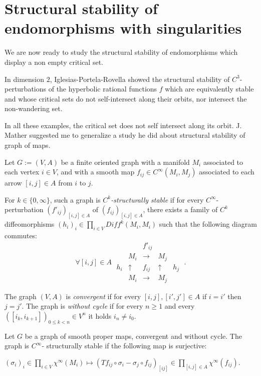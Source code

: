 \documentclass[11pt,openany,leqno]{article}
\begin{document}
\section{Structural stability of endomorphisms with singularities}
\label{Sec_SS_endo_w_Singu}
We are now ready to study the structural stability of endomorphisms which display a non empty critical set. 


In dimension $2$, Iglesias-Portela-Rovella \cite{IPR08} showed the structural stability of $C^3$-perturbations of the hyperbolic rational functions $f$ which are equivalently stable and whose critical sets do not self-intersect along their orbits, nor intersect the non-wandering set. 

In all these examples, the critical set does not self intersect along its orbit. J. Mather suggested me to generalize a study he did about structural stability of graph of maps.


Let $G:=(V,A)$ be a finite oriented graph with a manifold $M_i$ associated to each vertex $i\in V$, and with a smooth map $f_{ij}\in C^\infty(M_i,M_j)$ associated to each arrow $[i,j]\in A$ from $i$ to $j$.


For $k\in \{0,\infty\}$, such a graph is \emph{ $C^k$-structurally stable} if for every $C^\infty$-perturbation 
$(f'_{ij})_{[i,j]\in A}$ of $(f_{ij})_{[i,j]\in A}$, there exists a family of $C^k$ diffeomorphisms $(h_{i})_i\in \prod_{i\in V} Diff^k(M_i, M_i)$ such that the following diagram commutes:
\[\forall [i,j]\in A\; \begin{array}{rcccl}
& &f'_{ij} & &\\ 
&M_i & \rightarrow&M_j &\\
h_i&\uparrow& f_{ij}&\uparrow&h_j\\
&M_i & \rightarrow&M_j & \end{array}\; .\]

The graph $(V, A)$ is \emph{convergent} if for every $[i,j], [i',j']\in A$ if $i=i'$ then $j=j'$. The graph is \emph{without cycle} if for every $n\ge 1$ and every  $([i_k,i_{k+1}])_{0\le k< n}\in V^n$ it holds $i_n\not= i_0$. 


\begin{thm}[Mather]
Let $G$ be a graph of smooth proper maps, convergent and without cycle. The graph is $C^\infty$- structurally stable if the following map is surjective:

$(\sigma_i)_i\in \prod_{i\in V}\chi^\infty(M_i)\mapsto (Tf_{ij}\circ\sigma_i-\sigma_j\circ f_{ij})_{[ij]}\in \prod_{[i, j]\in A}\chi^\infty (f_{ij}).$
\end{thm}
\end{document}
